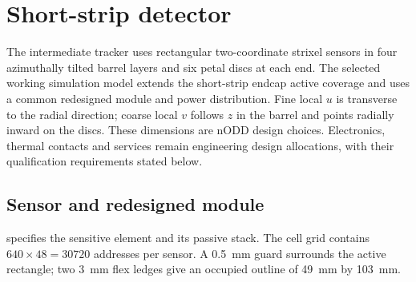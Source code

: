 \section{Short-strip detector}
\label{sec:short-strips}
The intermediate tracker uses rectangular two-coordinate strixel sensors in four
azimuthally tilted barrel layers and six petal discs at each end. The selected
working simulation model extends the short-strip endcap active coverage and
uses a common redesigned module and power distribution. Fine local $u$ is
transverse to the radial direction; coarse local $v$ follows $z$ in the barrel
and points radially inward on the discs. These dimensions are nODD design
choices. Electronics, thermal contacts and services remain engineering design
allocations, with their qualification requirements stated below.

\subsection{Sensor and redesigned module}
 specifies the sensitive element and its passive stack.
The cell grid contains $640\times48=\num{30720}$ addresses per sensor. A
\qty{0.5}{\milli\metre} guard surrounds the active rectangle; two
\qty{3}{\milli\metre} flex ledges give an occupied outline of
\qty{49}{\milli\metre} by \qty{103}{\milli\metre}.

